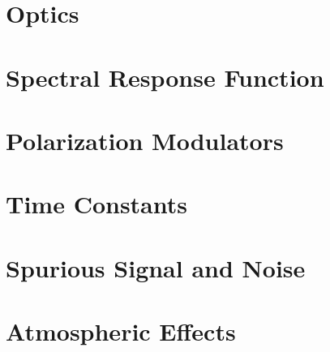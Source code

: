 \documentclass[
12pt, %
letterpaper, %
oneside, %
headinclude,footinclude, %
BCOR5mm, %
]{scrartcl}
\begin{document}

\section{Optics}



\section{Spectral Response Function}


\section{Polarization Modulators}


\section{Time Constants}


\section{Spurious Signal and Noise}


\section{Atmospheric Effects}




 


\renewcommand{\refname}{\spacedlowsmallcaps{References}} %


\end{document}
